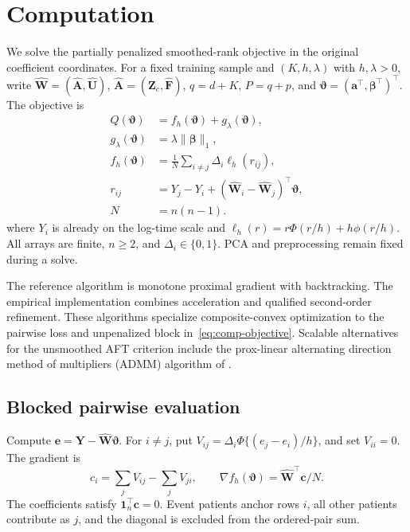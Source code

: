 \section{Computation}
\label{sec:computation}

We solve the partially penalized smoothed-rank objective in the original coefficient coordinates. For a fixed training sample and $(K,h,\lambda)$ with $h,\lambda>0$, write $\widehat{\bm{W}}=(\widehat{\bm{A}},\widehat{\bm{U}})$, $\widehat{\bm{A}}=(\bm{Z}_c,\widehat{\bm{F}})$, $q=d+K$, $P=q+p$, and $\bm{\vartheta}=(\bm{a}^\top,\bm{\beta}^\top)^\top$. The objective is
\begin{equation}
\begin{aligned}
Q(\bm\vartheta)&=f_h(\bm\vartheta)+g_\lambda(\bm\vartheta),\\
g_\lambda(\bm\vartheta)&=\lambda\|\bm\beta\|_1,\\
f_h(\bm\vartheta)&=\frac1N\sum_{i\ne j}\Delta_i\ell_h(r_{ij}),\\
r_{ij}&=Y_j-Y_i+(\widehat{\bm W}_i-\widehat{\bm W}_j)^\top\bm\vartheta,\\
N&=n(n-1).
\end{aligned}
\label{eq:comp-objective}
\end{equation}
where $Y_i$ is already on the log-time scale and $\ell_h(r)=r\Phi(r/h)+h\phi(r/h)$. All arrays are finite, $n\ge2$, and $\Delta_i\in\{0,1\}$. PCA and preprocessing remain fixed during a solve.

The reference algorithm is monotone proximal gradient with backtracking. The empirical implementation combines acceleration and qualified second-order refinement. These algorithms specialize composite-convex optimization \citep{BeckTeboulle2009,ParikhBoyd2014} to the pairwise loss and unpenalized block in~\eqref{eq:comp-objective}. Scalable alternatives for the unsmoothed AFT criterion include the prox-linear alternating direction method of multipliers (ADMM) algorithm of \citet{SuderMolstad2022}.

\subsection{Blocked pairwise evaluation}
\label{subsec:comp-evaluation}
Compute $\bm{e}=\bm Y-\widehat{\bm{W}}\bm{\vartheta}$. For $i\ne j$, put $V_{ij}=\Delta_i\Phi\{(e_j-e_i)/h\}$, and set $V_{ii}=0$. The gradient is
\begin{equation}
 c_i=\sum_jV_{ij}-\sum_jV_{ji},\qquad
 \nabla f_h(\bm{\vartheta})=\widehat{\bm{W}}^\top \bm{c}/N.
 \label{eq:comp-gradient}
\end{equation}
The coefficients satisfy $\mathbf 1_n^\top \bm{c}=0$. Event patients anchor rows $i$, all other patients contribute as $j$, and the diagonal is excluded from the ordered-pair sum.

